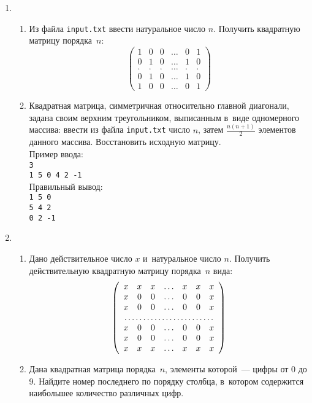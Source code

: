 \documentclass{article}
\newcommand{\textex}[1]{\texttt{\color{ForestGreen}#1}}
\begin{document}
\begin{enumerate}[label={}, leftmargin=0pt, itemindent=0pt]
\item
\begin{enumerate}[label=\arabic{enumi}.\arabic*.] %
  \item
  Из файла \texttt{input.txt} ввести натуральное число $n$. Получить квадратную матрицу порядка~$n$:
  \[
  \left(
  \begin{array}{cccccc}
    1 & 0 & 0 & \ldots & 0 & 1\\
    0 & 1 & 0 & \ldots & 1 & 0\\
    . & . & . & \ldots & . & .\\
    0 & 1 & 0 & \ldots & 1 & 0\\
    1 & 0 & 0 & \ldots & 0 & 1
  \end{array}
  \right)
  \]
  \item
  Квадратная матрица, симметричная относительно главной диагонали, задана своим верхним треугольником, выписанным в~виде одномерного массива: ввести из файла \texttt{input.txt} число $n$, затем $\frac{n(n+1)}{2}$ элементов данного массива. Восстановить исходную матрицу.\\
  Пример ввода:\\\textex{3\\1 5 0 4 2 -1}\\
  Правильный вывод:\\\textex{1 5 0\\ 5 4 2\\ 0 2 -1}
\end{enumerate}

\item
\begin{enumerate}[label=\arabic{enumi}.\arabic*.] %
  \item
  Дано действительное число $x$ и~натуральное число $n$. Получить действительную квадратную матрицу порядка~$n$ вида:
  \[
    \left(
    \begin{array}{ccccccc}
    x & x & x & \ldots & x & x & x\\
    x & 0 & 0 & \ldots & 0 & 0 & x\\
    x & 0 & 0 & \ldots & 0 & 0 & x\\
    \multicolumn{7}{c}{\dotfill}\\
    x & 0 & 0 & \ldots & 0 & 0 & x\\
    x & 0 & 0 & \ldots & 0 & 0 & x\\
    x & x & x & \ldots & x & x & x\\
    \end{array}
    \right)
    \]
  \item
  Дана квадратная матрица порядка~$n$, элементы которой~— цифры от 0 до 9. Найдите номер последнего по порядку столбца, в~котором содержится наибольшее количество различных цифр.
\end{enumerate}


\end{enumerate}
\end{document}
